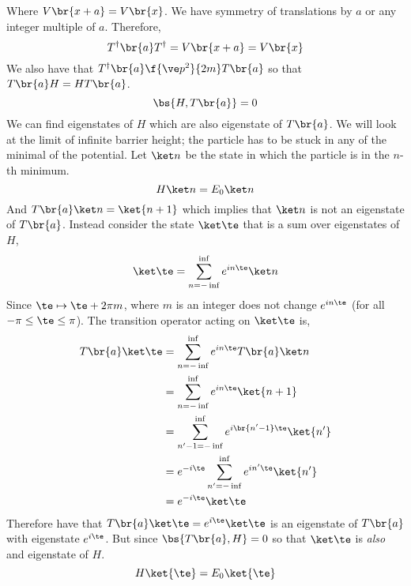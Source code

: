 \documentclass{article}
\begin{document}
Where $V\br{x + a} = V\br{x}$. We have symmetry of translations by $a$ or any integer multiple of $a$. Therefore,
\[ T^{\dagger}\br{a}T^{\dagger} = V\br{x + a} = V\br{x} \]
We also have that $T^{\dagger}\br{a} \f{\ve p^2}{2m} T\br{a}$ so that $T\br{a} H = H T\br{a}$.
\[ \bs{H, T\br{a}} = 0 \]
We can find eigenstates of $H$ which are also eigenstate of $T\br{a}$. We will look at the limit of infinite barrier height; the particle has to be stuck in any of the minimal of the potential. Let $\ket n$ be the state in which the particle is in the $n$-th minimum.
\[ H\ket n = E_0 \ket n \]
And $T\br{a} \ket n = \ket {n+1}$ which implies that $\ket n$ is not an eigenstate of $T\br{a}$. Instead consider the state $\ket \te$ that is a sum over eigenstates of $H$,
\[ \ket \te = \sum_{n = -\inf}^{\inf} e^{i n \te} \ket n \]
Since $\te \mapsto \te + 2 \pi m$, where $m$ is an integer does not change $e^{i n \te}$ (for all $ -\pi \leq \te \leq \pi$). The transition operator acting on $\ket \te$ is,
\begin{align*}
    T\br{a} \ket \te
    &= \sum_{n = - \inf}^{\inf} e^{i n \te} T\br{a} \ket n \\
    &= \sum_{n = - \inf}^{\inf} e^{i n \te} \ket {n+1} \\
    &= \sum_{n' - 1 = - \inf}^{\inf} e^{i \br{n' - 1} \te} \ket {n'} \\
    &= e^{-i\te}\sum_{n' = - \inf}^{\inf} e^{i n' \te} \ket {n'} \\
    &= e^{-i\te}\ket \te
\end{align*}
Therefore have that $T\br{a} \ket \te = e^{i \te} \ket \te$ is an eigenstate of $T\br{a}$ with eigenstate $e^{i \te}$. But since $\bs{T\br{a}, H} = 0$ so that $\ket \te$ is \textit{also} and eigenstate of $H$.
\[ H \ket{\te} = E_{0} \ket {\te} \]
\end{document}

